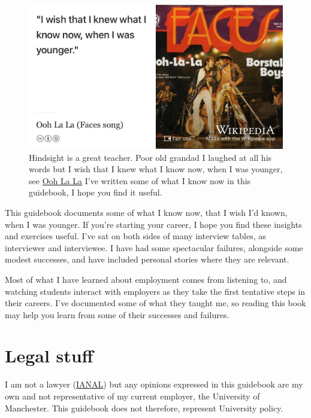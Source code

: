 \documentclass[
]{book}
\begin{document}
\begin{figure}

{\centering \includegraphics[width=0.99\linewidth]{images/faces} 

}

\caption{Hindsight is a great teacher. Poor old grandad I laughed at all his words but I wish that I knew what I know now, when I was younger, see \href{https://en.wikipedia.org/wiki/Ooh_La_La_(Faces_song)}{Ooh La La} \citep{faces} I've written some of what I know now in this guidebook, I hope you find it useful.}\label{fig:faces-fig}
\end{figure}



This guidebook documents some of what I know now, that I wish I'd known, when I was younger. If you're starting your career, I hope you find these insights and exercises useful. I've sat on both sides of many interview tables, as interviewer and interviewee. I have had some spectacular failures, alongside some modest successes, and have included personal stories where they are relevant.

Most of what I have learned about employment comes from listening to, and watching students interact with employers as they take the first tentative steps in their careers. I've documented some of what they taught me, so reading this book may help you learn from some of their successes and failures.

\hypertarget{legal}{%
\section{Legal stuff}\label{legal}}

I am not a lawyer (\href{https://en.wikipedia.org/wiki/IANAL}{IANAL}) but any opinions expressed in this guidebook are my own and not representative of my current employer, the University of Manchester. This guidebook does not therefore, represent University policy.
\end{document}
